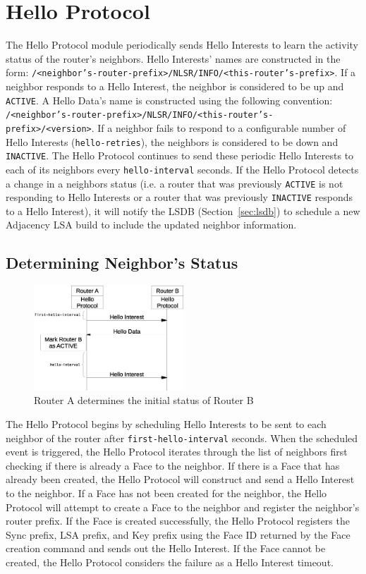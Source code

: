 \section{Hello Protocol}
\label{sec:hello-protocol}

The Hello Protocol module periodically sends Hello Interests to learn the activity status of the router's neighbors.
Hello Interests' names are constructed in the form: \texttt{/<neighbor's-router-prefix>/NLSR/INFO/<this-router's-prefix>}.
If a neighbor responds to a Hello Interest, the neighbor is considered to be up and \texttt{ACTIVE}.
A Hello Data's name is constructed using the following convention: \texttt{/<neighbor's-router-prefix>/NLSR/INFO/<this-router's-prefix>/<version>}.
If a neighbor fails to respond to a configurable number of Hello Interests (\texttt{hello-retries}), the neighbors is considered to be down and \texttt{INACTIVE}.
The Hello Protocol continues to send these periodic Hello Interests to each of its neighbors every \texttt{hello-interval} seconds.
If the Hello Protocol detects a change in a neighbors status
(i.e. a router that was previously \texttt{ACTIVE} is not responding to Hello Interests or a router that was previously \texttt{INACTIVE} responds to a Hello Interest),
it will notify the LSDB (Section~\ref{sec:lsdb}) to schedule a new Adjacency LSA build to include the updated neighbor information.

\subsection{Determining Neighbor's Status}
\label{sec:initial-status}

\begin{figure}
\center
\includegraphics[width=0.5\textwidth]{figures/hello-protocol}
\caption{Router A determines the initial status of Router B}
\end{figure}

The Hello Protocol begins by scheduling Hello Interests to be sent to each neighbor of the router after \texttt{first-hello-interval} seconds.
When the scheduled event is triggered, the Hello Protocol iterates through the list of neighbors first checking if there is already a Face to the neighbor.
If there is a Face that has already been created, the Hello Protocol will construct and send a Hello Interest to the neighbor.
If a Face has not been created for the neighbor, the Hello Protocol will attempt to create a Face to the neighbor and register the neighbor's router prefix.
If the Face is created successfully, the Hello Protocol registers the Sync prefix, LSA prefix, and Key prefix using the Face ID returned by the Face creation command and sends out the Hello Interest.
If the Face cannot be created, the Hello Protocol considers the failure as a Hello Interest timeout.

